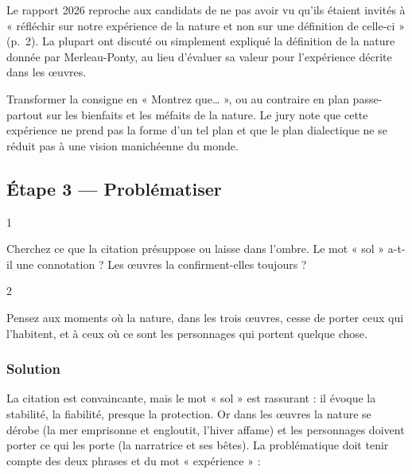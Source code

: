 \documentclass[11pt,a4paper]{article}
\begin{document}
\begin{jury}

Le rapport 2026 reproche aux candidats de ne pas avoir vu qu'ils étaient invités à « réfléchir sur notre expérience de la nature et non sur une définition de celle-ci » (p.~2). La plupart ont discuté ou simplement expliqué la définition de la nature donnée par Merleau-Ponty, au lieu d'évaluer sa valeur pour l'expérience décrite dans les œuvres.

\end{jury}

\begin{piege}

Transformer la consigne en « Montrez que\ldots{} », ou au contraire en plan passe-partout sur les bienfaits et les méfaits de la nature. Le jury note que cette expérience ne prend pas la forme d'un tel plan et que le plan dialectique ne se réduit pas à une vision manichéenne du monde.

\end{piege}

\hypertarget{uxe9tape-3-probluxe9matiser}{%
\subsection{Étape 3 --- Problématiser}\label{uxe9tape-3-probluxe9matiser}}

\begin{indication}{1}

Cherchez ce que la citation présuppose ou laisse dans l'ombre. Le mot « sol » a-t-il une connotation ? Les œuvres la confirment-elles toujours ?

\end{indication}

\begin{indication}{2}

Pensez aux moments où la nature, dans les trois œuvres, cesse de porter ceux qui l'habitent, et à ceux où ce sont les personnages qui portent quelque chose.

\end{indication}

\hypertarget{solution-2}{%
\subsubsection{Solution}\label{solution-2}}

La citation est convaincante, mais le mot « sol » est rassurant : il évoque la stabilité, la fiabilité, presque la protection. Or dans les œuvres la nature se dérobe (la mer emprisonne et engloutit, l'hiver affame) et les personnages doivent porter ce qui les porte (la narratrice et ses bêtes). La problématique doit tenir compte des deux phrases et du mot « expérience » :
\end{document}
